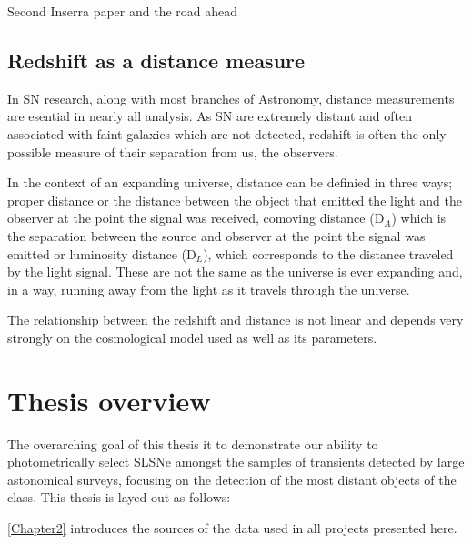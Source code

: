 Second Inserra paper and the road ahead

\subsection{Redshift as a distance measure}
In SN research, along with most branches of Astronomy, distance measurements are esential in nearly all analysis. As SN are extremely distant and often associated with faint galaxies which are not detected, redshift is often the only possible measure of their separation from us, the observers.

In the context of an expanding universe, distance can be definied in three ways; proper distance or the distance between the object that emitted the light and the observer at the point the signal was received, comoving distance (D$_A$) which is the separation between the source and observer at the point the signal was emitted or luminosity distance (D$_L$), which corresponds to the distance traveled by the light signal. These are not the same as the universe is ever expanding and, in a way, running away from the light as it travels through the universe.

The relationship between the redshift and distance is not linear and depends very strongly on the cosmological model used as well as its parameters.


\section{Thesis overview}
The overarching goal of this thesis it to demonstrate our ability to photometrically select SLSNe amongst the samples of transients detected by large astonomical surveys, focusing on the detection of the most distant objects of the class. This thesis is layed out as follows:

\cref{Chapter2} introduces the sources of the data used in all projects presented here.
